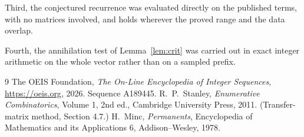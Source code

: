 \documentclass[11pt,a4paper]{article}
\theoremstyle{plain}
\theoremstyle{definition}
\begin{document}
Third, the conjectured recurrence was evaluated directly on the published terms, with no
matrices involved, and holds wherever the proved range and the data overlap.

Fourth, the annihilation test of Lemma~\ref{lem:crit} was carried out in exact integer
arithmetic on the whole vector rather than on a sampled prefix.

\begin{thebibliography}{9}
 The OEIS Foundation, \emph{The On-Line Encyclopedia of Integer
Sequences}, \url{https://oeis.org}, 2026. Sequence A189445.
 R.~P.~Stanley, \emph{Enumerative Combinatorics}, Volume 1, 2nd ed.,
Cambridge University Press, 2011. (Transfer-matrix method, Section 4.7.)
 H.~Minc, \emph{Permanents}, Encyclopedia of Mathematics and its
Applications 6, Addison--Wesley, 1978.
\end{thebibliography}
\end{document}
